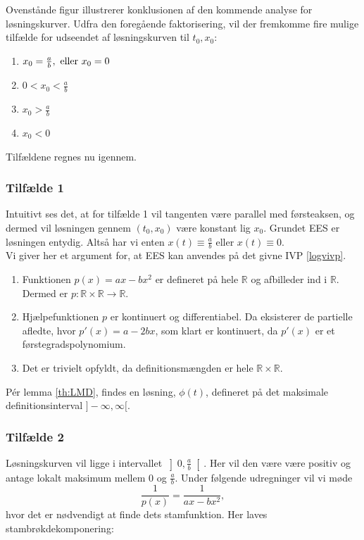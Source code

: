 Ovenstånde figur illustrerer konklusionen af den kommende analyse for løsningskurver. Udfra den foregående faktorisering, vil der fremkomme fire mulige tilfælde for udseendet af løsningskurven til $t_0, x_0$:
\begin{enumerate}
    \item $x_0 = \frac{a}{b}, \ \textnormal{eller} \ x_0 = 0$ \\
    \item $0 < x_0 < \frac{a}{b}$\\
    \item $x_0 > \frac{a}{b}$ \\
    \item $x_0 < 0$ \\
\end{enumerate}
Tilfældene regnes nu igennem.

\subsubsection{Tilfælde 1}
Intuitivt ses det, at for tilfælde 1 vil tangenten være parallel med førsteaksen, og dermed vil løsningen gennem $(t_0, x_0)$ være konstant lig $x_0$. Grundet EES \citep{EES} er løsningen entydig. 
Altså har vi enten $x(t) \equiv \frac{a}{b}$ eller $x(t) \equiv 0$.\\
Vi giver her et argument for, at EES kan anvendes på det givne IVP \eqref{logvivp}.\\

\begin{enumerate}
    \item Funktionen $p(x)=ax-bx^2$ er defineret på hele $\mathbb{R}$ og afbilleder ind i $\mathbb{R}$. Dermed er $p \colon \mathbb{R}\times \mathbb{R}\to \mathbb{R}$.
    \item Hjælpefunktionen $p$ er kontinuert og differentiabel. Da eksisterer de partielle afledte, hvor $p'(x)=a-2bx$, som klart er kontinuert, da $p'(x)$ er et førstegradspolynomium.\\
    \item Det er trivielt opfyldt, da definitionsmængden er hele $\mathbb{R} \times \mathbb{R}$.\\ 
\end{enumerate}
Pér lemma \ref{th:LMD}, findes en løsning, $\phi(t)$, defineret på det maksimale definitionsinterval $]-\infty,\infty [$.

\subsubsection{Tilfælde 2}
Løsningskurven vil ligge i intervallet $\left] 0, \frac{a}{b} \right[$. Her vil den være være positiv og antage lokalt maksimum mellem $0$ og $\frac{a}{b}$.
Under følgende udregninger vil vi møde
\begin{equation*}
  \frac{1}{p(x)}=\frac{1}{ax-bx^2},
\end{equation*} 
hvor det er nødvendigt at finde dets stamfunktion. Her laves stambrøkdekomponering:

